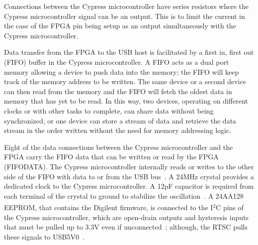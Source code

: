 Connections between the Cypress microcontroller have series resistors where the Cypress microcontroller signal can be an output.  This is to limit the current in the case of the FPGA pin being setup as an output simultaneously with the Cypress microcontroller.

Data transfer from the FPGA to the USB host is facilitated by a first in, first out (FIFO) buffer in the Cypress microcontroller.  A FIFO acts as a dual port memory allowing a device to push data into the memory; the FIFO will keep track of the memory address to be written.  The same device or a second device can then read from the memory and the FIFO will fetch the oldest data in memory that has yet to be read.  In this way, two devices, operating on different clocks or with other tasks to complete, can share data without being synchronized, or one device can store a stream of data and retrieve the data stream in the order written without the need for memory addressing logic.

Eight of the data connections between the Cypress microcontroller and the FPGA carry the FIFO data that can be written or read by the FPGA (FIFODATA).  The Cypress microcontroller internally reads or writes to the other side of the FIFO with data to or from the USB bus~\cite{CypressDS}.  A 24MHz crystal provides a dedicated clock to the Cypress microcontroller.  A 12pF capacitor is required from each terminal of the crystal to ground to stabilize the oscillation~\cite{DigilentNexys2rm}.  A 24AA128 EEPROM, that contains the Digilent\textsuperscript{\textregistered} firmware, is connected to the I$^2$C pins of the Cypress microcontroller, which are open-drain outputs and hysteresis inputs that must be pulled up to 3.3V even if unconnected~\cite{CypressDS}; although, the RTSC pulls these signals to USB5V0~\cite{DigilentNexys2sch}.
